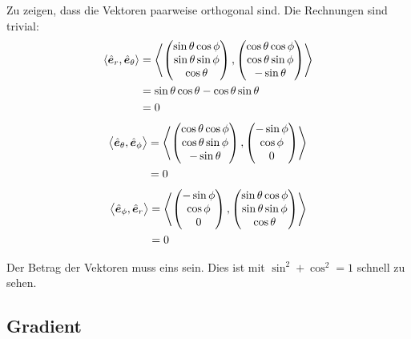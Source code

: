 Zu zeigen, dass die Vektoren paarweise orthogonal sind. Die Rechnungen sind
trivial:
\begin{align*}
	\left\langle \hat{\boldsymbol{e}}_r, \hat{\boldsymbol{e}}_\theta \right\rangle
	&= \left\langle 
	\begin{pmatrix}
		\sin\theta \cos\phi \\
		\sin\theta \sin\phi \\
		\cos\theta
	\end{pmatrix}
, 
	\begin{pmatrix}
		\cos\theta \cos\phi \\
		\cos\theta \sin\phi \\
		- \sin\theta
	\end{pmatrix}
 \right\rangle \\
&= \sin\theta \cos\theta - \cos\theta \sin\theta \\
&= 0
\end{align*}
\begin{align*}
	\left\langle \hat{\boldsymbol{e}}_\theta, \hat{\boldsymbol{e}}_\phi \right\rangle
	&= \left\langle 
	\begin{pmatrix}
		\cos\theta \cos\phi \\
		\cos\theta \sin\phi \\
		- \sin\theta
	\end{pmatrix}
, 
	\begin{pmatrix}
		-\sin\phi \\
		\cos\phi \\
		0
	\end{pmatrix}
 \right\rangle \\
&= 0
\end{align*}
\begin{align*}
	\left\langle \hat{\boldsymbol{e}}_\phi, \hat{\boldsymbol{e}}_r \right\rangle
	&= \left\langle 
	\begin{pmatrix}
		-\sin\phi \\
		\cos\phi \\
		0
	\end{pmatrix}
, 
	\begin{pmatrix}
		\sin\theta \cos\phi \\
		\sin\theta \sin\phi \\
		\cos\theta
	\end{pmatrix}
 \right\rangle \\
&= 0
\end{align*}

Der Betrag der Vektoren muss eins sein. Dies ist mit $\sin^2 + \cos^2 = 1$
schnell zu sehen.

\subsection{Gradient}

